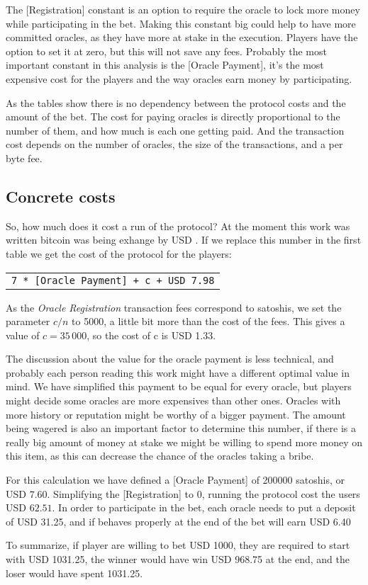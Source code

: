 The [Registration] constant is an option to require the oracle to lock more
  money while participating in the bet.
Making this constant big could help to have more committed oracles, as they
  have more at stake in the execution.
Players have the option to set it at zero, but this will not save any fees.
Probably the most important constant in this analysis is the [Oracle Payment],
  it's the most expensive cost for the players and the way oracles earn money
  by participating.

As the tables show there is no dependency between the protocol costs and the
  amount of the bet.
The cost for paying oracles is directly proportional to the number of them, and
  how much is each one getting paid.
And the transaction cost depends on the number of oracles, the size of the
  transactions, and a per byte fee.

\subsection{Concrete costs}

So, how much does it cost a run of the protocol?
At the moment this work was written bitcoin was being exhange by USD
  \bitcoinusd{}.
If we replace this number in the first table we get the cost of the protocol for
  the players:
\begin{center}
    \begin{tabular}{|c|}
        \texttt{7 * [Oracle Payment] + c + USD 7.98}
    \end{tabular}
\end{center}

As the \textit{Oracle Registration} transaction fees correspond to
  \mbox{} satoshis, we set the parameter $c/n$ to 5000, a
  little bit more than the cost of the fees.
This gives a value of $c = 35\,000$, so the cost of c is USD 1.33.

The discussion about the value for the oracle payment is less technical, and
  probably each person reading this work might have a different optimal value
  in mind.
We have simplified this payment to be equal for every oracle, but players
  might decide some oracles are more expensives than other ones.
Oracles with more history or reputation might be worthy of a bigger payment.
The amount being wagered is also an important factor to determine this number,
  if there is a really big amount of money at stake we might be willing to
  spend more money on this item, as this can decrease the chance of the oracles
  taking a bribe.

For this calculation we have defined a [Oracle Payment] of \num{200000}
  satoshis, or USD $7.60$. Simplifying the [Registration] to 0, running the
  protocol cost the users USD $62.51$.
In order to participate in the bet, each oracle needs to put a deposit of
  USD 31.25, and if behaves properly at the end of the bet will earn USD 6.40

To summarize, if player are willing to bet USD 1000, they are required to start
  with USD 1031.25, the winner would have win USD 968.75 at the end, and the
  loser would have spent 1031.25.
